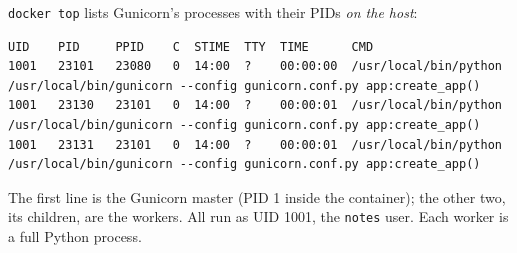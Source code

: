\noindent{}\texttt{docker\ top} lists Gunicorn's processes with their PIDs \emph{on the host}:

\begin{outputbox}[short]
\begin{Verbatim}[fontsize=\codesize, breaklines, breakanywhere, breaksymbolleft={\tiny\textcolor{muted}{$\hookrightarrow$}}]
UID    PID     PPID    C  STIME  TTY  TIME      CMD
1001   23101   23080   0  14:00  ?    00:00:00  /usr/local/bin/python /usr/local/bin/gunicorn --config gunicorn.conf.py app:create_app()
1001   23130   23101   0  14:00  ?    00:00:01  /usr/local/bin/python /usr/local/bin/gunicorn --config gunicorn.conf.py app:create_app()
1001   23131   23101   0  14:00  ?    00:00:01  /usr/local/bin/python /usr/local/bin/gunicorn --config gunicorn.conf.py app:create_app()
\end{Verbatim}
\end{outputbox}

\noindent{}The first line is the Gunicorn master (PID 1 inside the container); the other two, its children, are the workers. All run as UID 1001, the \texttt{notes} user. Each worker is a full Python process.

